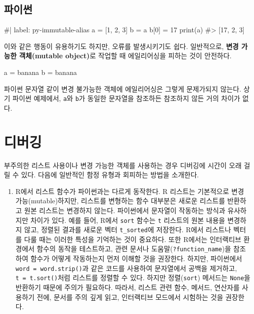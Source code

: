 \documentclass[
  letterpaper,
]{book}
\newenvironment{Shaded}{\begin{snugshade}}{\end{snugshade}}
\newcommand{\NormalTok}[1]{\textcolor[rgb]{0.00,0.23,0.31}{#1}}
\newcommand{\OperatorTok}[1]{\textcolor[rgb]{0.37,0.37,0.37}{#1}}
\newcommand{\StringTok}[1]{\textcolor[rgb]{0.13,0.47,0.30}{#1}}
\providecommand{\tightlist}{%
  \setlength{\itemsep}{0pt}\setlength{\parskip}{0pt}}\usepackage{longtable,booktabs,array}
\begin{document}
\subsection{파이썬}

\begin{Shaded}
\begin{Highlighting}[]
\NormalTok{\#| label: py{-}immutable{-}alias}
\NormalTok{a = [1, 2, 3]}
\NormalTok{b = a}
\NormalTok{b[0] = 17}
\NormalTok{print(a)}
\NormalTok{\#\textgreater{} [17, 2, 3]}
\end{Highlighting}
\end{Shaded}

이와 같은 행동이 유용하기도 하지만, 오류를 발생시키기도 쉽다.
일반적으로, \textbf{변경 가능한 객체(mutable object)}로 작업할 때
에일리어싱을 피하는 것이 안전하다. 

\begin{Shaded}
\begin{Highlighting}[]
\NormalTok{a }\OperatorTok{=} \StringTok{\textquotesingle{}banana\textquotesingle{}}
\NormalTok{b }\OperatorTok{=} \StringTok{\textquotesingle{}banana\textquotesingle{}}
\end{Highlighting}
\end{Shaded}

파이썬 문자열 같이 변경 불가능한 객체에 에일리어싱은 그렇게 문제가되지
않는다. 상기 파이썬 예제에서, \texttt{a}와 \texttt{b}가 동일한 문자열을
참조하든 참조하지 않든 거의 차이가 없다.

\section{디버깅}\label{r-list-debug}


부주의한 리스트 사용이나 변경 가능한 객체를 사용하는 경우 디버깅에
시간이 오래 걸릴 수 있다. 다음에 일반적인 함정 유형과 회피하는 방법을
소개한다.

\begin{enumerate}
\def\labelenumi{\arabic{enumi}.}
\tightlist
\item
  R에서 리스트 함수가 파이썬과는 다르게 동작한다. R 리스트는 기본적으로
  변경 가능(mutable)하지만, 리스트를 변형하는 함수 대부분은 새로운
  리스트를 반환하고 원본 리스트는 변경하지 않는다. 파이썬에서 문자열이
  작동하는 방식과 유사하지만 차이가 있다. 예를 들어, R에서 \texttt{sort}
  함수는 \texttt{t} 리스트의 원본 내용을 변경하지 않고, 정렬된 결과를
  새로운 벡터 \texttt{t\_sorted}에 저장한다. R에서 리스트나 벡터를 다룰
  때는 이러한 특성을 기억하는 것이 중요하다. 또한 R에서는 인터랙티브
  환경에서 함수의 동작을 테스트하고, 관련 문서나
  도움말(\texttt{?function\_name})을 참조하여 함수가 어떻게 작동하는지
  먼저 이해할 것을 권장한다. 하지만, 파이썬에서
  \texttt{word\ =\ word.strip()}과 같은 코드를 사용하여 문자열에서
  공백을 제거하고, \texttt{t\ =\ t.sort()}처럼 리스트를 정렬할 수 있다.
  하지만 정렬(\texttt{sort}) 메서드는 \texttt{None}을 반환하기 때문에
  주의가 필요하다. 따라서, 리스트 관련 함수, 메서드, 연산자를 사용하기
  전에, 문서를 주의 깊게 읽고, 인터랙티브 모드에서 시험하는 것을
  권장한다.
\end{enumerate}
\end{document}
